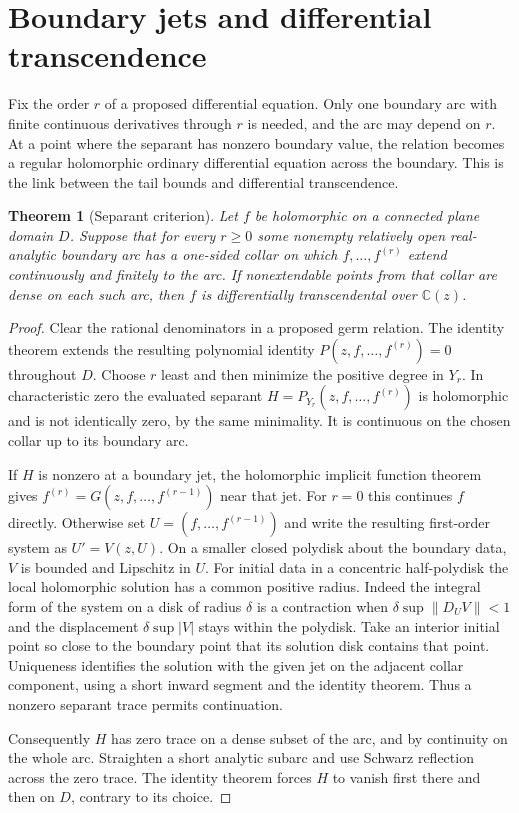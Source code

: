 \documentclass[11pt]{article}
\numberwithin{equation}{section}
\newtheorem{theorem}{Theorem}[section]
\theoremstyle{definition}
\newcommand{\C}{\mathbb C}
\begin{document}
\section{Boundary jets and differential transcendence}
\label{da:new:section}

Fix the order $r$ of a proposed differential equation. Only one
boundary arc with finite continuous derivatives through $r$ is needed,
and the arc may depend on $r$. At a point where the separant has
nonzero boundary value, the relation becomes a regular holomorphic
ordinary differential equation across the boundary. This is the link
between the tail bounds and differential transcendence.

\begin{theorem}[Separant criterion]\label{da:new:separant}
Let $f$ be holomorphic on a connected plane domain $D$. Suppose
that for every $r\ge0$ some nonempty relatively open real-analytic
boundary arc has a one-sided collar on which $f,\ldots,f^{(r)}$
extend continuously and finitely to the arc. If nonextendable
points from that collar are dense on each such arc, then $f$ is
differentially transcendental over $\C(z)$.
\end{theorem}
\begin{proof}
Clear the rational denominators in a proposed germ relation.
The identity theorem extends the resulting polynomial identity
$P(z,f,\ldots,f^{(r)})=0$ throughout $D$.
Choose $r$ least and then minimize the positive degree in $Y_r$.
In characteristic zero the evaluated separant
$H=P_{Y_r}(z,f,\ldots,f^{(r)})$ is holomorphic and is not
identically zero, by the same minimality. It is continuous on
the chosen collar up to its boundary arc.

If $H$ is nonzero at a boundary jet, the holomorphic implicit
function theorem gives $f^{(r)}=G(z,f,\ldots,f^{(r-1)})$ near
that jet. For $r=0$ this continues $f$ directly. Otherwise set
$U=(f,\ldots,f^{(r-1)})$ and write the resulting first-order
system as $U'=V(z,U)$. On a smaller closed polydisk about the
boundary data, $V$ is bounded and Lipschitz in $U$. For initial
data in a concentric half-polydisk the local holomorphic solution
has a common positive radius. Indeed the integral form of the
system on a disk of radius $\delta$ is a contraction when
$\delta\sup\|D_U V\|<1$ and the displacement $\delta\sup|V|$
stays within the polydisk. Take an interior initial point so
close to the boundary point that its solution disk contains
that point. Uniqueness identifies the solution with the given
jet on the adjacent collar component, using a short inward segment
and the identity theorem. Thus a nonzero separant trace permits
continuation.

Consequently $H$ has zero trace on a dense subset of the arc,
and by continuity on the whole arc. Straighten a short analytic
subarc and use Schwarz reflection across the zero trace. The
identity theorem forces $H$ to vanish first there and then on
$D$, contrary to its choice.
\end{proof}
\end{document}
